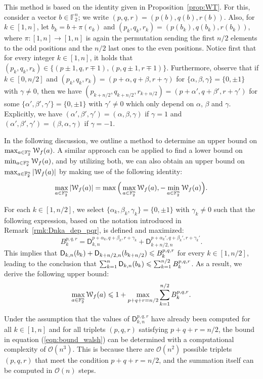 \documentclass[11pt]{llncs}
\begin{document}
This method is based on the identity given in Proposition~\ref{prop:WT}.
For this, consider a vector $b\in\mathbb F_2^n$; we write $(p,q,r)=(p(b),q(b),r(b))$. Also, for $k\in[1,n]$, let $b_k=b+\pi(e_k)$ and $(p_k,q_k,r_k)=(p(b_k),q(b_k),r(b_k))$, where $\pi:[1,n]\to[1,n]$ is again the permutation sending the first $n/2$ elements to the odd positions and the $n/2$ last ones to the even positions. Notice first that for every integer $k\in[1,n]$, it holds that $(p_k,q_k,r_k)\in\{(p\pm1,q,r\mp 1),(p,q\pm 1,r\mp 1)\}$. Furthermore, observe that if $k\in[0,n/2]$ and $(p_k,q_k,r_k)=(p+\alpha,q+\beta,r+\gamma)$ for $\{\alpha,\beta,\gamma\}=\{0,\pm 1\}$ with $\gamma\neq 0$, then we have $(p_{k+n/2},q_{k+n/2},r_{k+n/2})=(p+\alpha',q+\beta',r+\gamma')$ for some $\{\alpha',\beta',\gamma'\}=\{0,\pm 1\}$ with $\gamma'\neq 0$ which only depend on $\alpha$, $\beta$ and $\gamma$. Explicitly, we have $(\alpha',\beta',\gamma')=(\alpha,\beta,\gamma)$ if $\gamma=1$ and $(\alpha',\beta',\gamma')=(\beta,\alpha,\gamma)$ if $\gamma=-1$.

In the following discussion, we outline a method to determine an upper bound on $\max_{a\in\F_2^n}\wt f(a)$. A similar approach can be applied to find a lower bound on $\min_{a\in\F_2^n}\wt f(a)$, and by utilizing both, we can also obtain an upper bound on $\max_{a\in\F_2^n}|\wt f(a)|$ by making use of the following identity:
\[
	\max_{a\in\F_2^n}|\wt f(a)|=\max\Big(\max_{a\in\F_2^n}\wt f(a),-\min_{a\in\F_2^n}\wt f(a)\Big).
\]

For each $k\in[1,n/2]$, we select $\{\alpha_k,\beta_k,\gamma_k\}=\{0,\pm 1\}$ with $\gamma_k\neq 0$ such that the following expression, based on the notation introduced in Remark~\ref{rmk:Dnka_dep_pqr}, is defined and maximized:
\[
	B_k^{p,q,r}=\mathsf D_{k,n}^{p+\alpha_k,q+\beta_k,r+\gamma_k}+\mathsf D_{k+n/2,n}^{p+\alpha_k',q+\beta_k',r+\gamma_k'}.
\]
This implies that $\Dnka{n}{k}{b_k}+\Dnka{n}{k+n/2}{b_{k+n/2}}\leq B_k^{p,q,r}$ for every $k\in[1,n/2]$, leading to the conclusion that $\sum_{k=1}^n\Dnka nk{b_k}\leq\sum_{k=1}^{n/2} B_k^{p,q,r}$. As a result, we derive the following upper bound:
\begin{equation}\label{eqn:bound_walsh}
	\max_{a\in\F_2^n}\wt f(a)\leq 1+\max_{p+q+r=n/2}\sum_{k=1}^{n/2} B_k^{p,q,r}.
\end{equation}

Under the assumption that the values of $\mathsf{D}_{k,n}^{p,q,r}$ have already been computed for all $k\in[1,n]$ and for all triplets $(p,q,r)$ satisfying $p+q+r=n/2$, the bound in equation (\ref{eqn:bound_walsh}) can be determined with a computational complexity of $\mathcal{O}(n^3)$. This is because there are $\mathcal{O}(n^2)$ possible triplets $(p,q,r)$ that meet the condition $p+q+r=n/2$, and the summation itself can be computed in $\mathcal{O}(n)$ steps.
\end{document}

